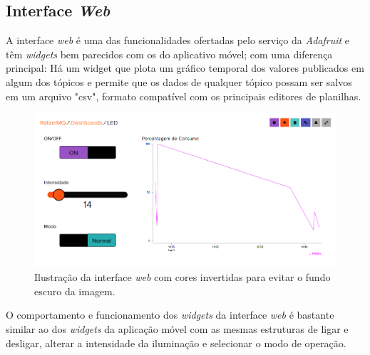 \subsection{Interface \textit{Web}}

A interface \textit{web} é uma das funcionalidades ofertadas pelo serviço da \textit{Adafruit} e têm \textit{widgets} bem parecidos com os do aplicativo móvel; com uma diferença principal: Há um widget que plota um gráfico temporal dos valores publicados em algum dos tópicos e permite que os dados de qualquer tópico possam ser salvos em um arquivo "csv", formato compatível com os principais editores de planilhas.

\begin{figure}[ht]
    \begin{center}
    \includegraphics[width=\textwidth]{figuras/adaio.PNG}
    \end{center}
    \caption[Ilustração da interface \textit{web}.]{Ilustração da interface \textit{web} com cores invertidas para evitar o fundo escuro da imagem.}
    \label{adaio}
\end{figure}

O comportamento e funcionamento dos \textit{widgets} da interface \textit{web} é bastante similar ao dos \textit{widgets} da aplicação móvel com as mesmas estruturas de ligar e desligar, alterar a intensidade da iluminação e selecionar o modo de operação.
